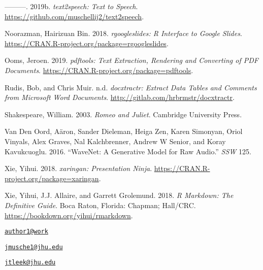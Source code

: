 \leavevmode\hypertarget{ref-text2speech}{}%
---------. 2019b. \emph{text2speech: Text to Speech}.
\url{https://github.com/muschellij2/text2speech}.

\leavevmode\hypertarget{ref-rgoogleslides}{}%
Noorazman, Hairizuan Bin. 2018. \emph{rgoogleslides: R Interface to
Google Slides}. \url{https://CRAN.R-project.org/package=rgoogleslides}.

\leavevmode\hypertarget{ref-pdftools}{}%
Ooms, Jeroen. 2019. \emph{pdftools: Text Extraction, Rendering and
Converting of PDF Documents}.
\url{https://CRAN.R-project.org/package=pdftools}.

\leavevmode\hypertarget{ref-docxtractr}{}%
Rudis, Bob, and Chris Muir. n.d. \emph{docxtractr: Extract Data Tables
and Comments from Microsoft Word Documents}.
\url{http://gitlab.com/hrbrmstr/docxtractr}.

\leavevmode\hypertarget{ref-shakespeare2003romeo}{}%
Shakespeare, William. 2003. \emph{Romeo and Juliet}. Cambridge
University Press.

\leavevmode\hypertarget{ref-van2016wavenet}{}%
Van Den Oord, Aäron, Sander Dieleman, Heiga Zen, Karen Simonyan, Oriol
Vinyals, Alex Graves, Nal Kalchbrenner, Andrew W Senior, and Koray
Kavukcuoglu. 2016. ``WaveNet: A Generative Model for Raw Audio.''
\emph{SSW} 125.

\leavevmode\hypertarget{ref-xaringan}{}%
Xie, Yihui. 2018. \emph{xaringan: Presentation Ninja}.
\url{https://CRAN.R-project.org/package=xaringan}.

\leavevmode\hypertarget{ref-rmarkdownbook}{}%
Xie, Yihui, J.J. Allaire, and Garrett Grolemund. 2018. \emph{R Markdown:
The Definitive Guide}. Boca Raton, Florida: Chapman; Hall/CRC.
\url{https://bookdown.org/yihui/rmarkdown}.



\address{%
Sean Kross\\
Cognitive Science, University of California, San Diego\\
9500 Gilman Dr.\\ La Jolla, CA 92093\\
}
\href{mailto:author1@work}{\nolinkurl{author1@work}}

\address{%
John Muschelli\\
Department of Biostatistics, Johns Hopkins Bloomberg School of Public
Health\\
615 N Wolfe Street\\ Baltimore, MD 21231\\
}
\href{mailto:jmusche1@jhu.edu}{\nolinkurl{jmusche1@jhu.edu}}

\address{%
Jeffrey T. Leek\\
Department of Biostatistics, Johns Hopkins Bloomberg School of Public
Health\\
615 N Wolfe Street\\ Baltimore, MD 21231\\
}
\href{mailto:jtleek@jhu.edu}{\nolinkurl{jtleek@jhu.edu}}

